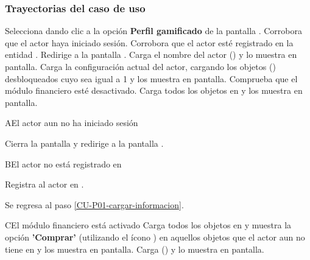 \subsubsection{Trayectorias del caso de uso}

\begin{UCtrayectoria}%
%
    \Actor Selecciona dando clic a la opción \textbf{Perfil gamificado} de la pantalla .
    \Sistema Corrobora que el actor haya iniciado sesión. 
    \Sistema Corrobora que el actor esté registrado en la entidad .  
    \Sistema Redirige a la pantalla .
    \label{CU-P01-cargar-informacion}
    \Sistema Carga el nombre del actor () y lo muestra en pantalla.
    \Sistema Carga la configuración actual del actor, 
    cargando los objetos  ()
    desbloqueados cuyo  sea igual a 1  y los muestra en pantalla.
    \Sistema Comprueba que el módulo financiero esté desactivado. 
    \Sistema Carga todos los objetos en  y los muestra en pantalla.
    
    
\end{UCtrayectoria}

\begin{UCtrayectoriaA}%
  {A}{El actor aun no ha iniciado sesión}

  \Sistema Cierra la pantalla  y redirige a la pantalla .

\end{UCtrayectoriaA}

\begin{UCtrayectoriaA}%
{B}{El actor no está registrado en }

    \Sistema Registra al actor en .
    \item Se regresa al paso \ref{CU-P01-cargar-informacion}.

\end{UCtrayectoriaA}


\begin{UCtrayectoriaA}%
{C}{El módulo financiero está activado}
    \Sistema Carga todos los objetos en  y muestra la opción \textbf{'Comprar'} (utilizando el ícono \IUMonedas{})
     en aquellos objetos que el actor
    aun no tiene en   y los muestra en pantalla.
    \Sistema Carga () y lo muestra en pantalla.

\end{UCtrayectoriaA}






